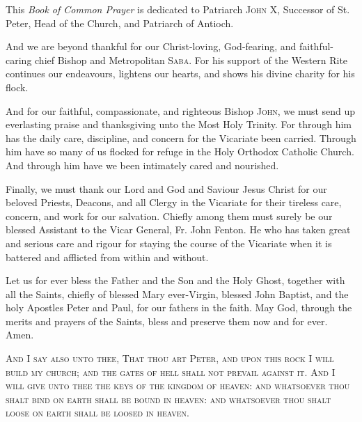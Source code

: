 {}
\noindent
This \textit{Book of Common Prayer} is dedicated to Patriarch \textsc{John X},  Successor of St. Peter, Head of the Church, and Patriarch of Antioch.\\
\par\noindent
And we are beyond thankful for our Christ-loving, God-fearing, and faithful-caring chief Bishop and Metropolitan \textsc{Saba}. For his support of the Western Rite continues our endeavours, lightens our hearts, and shows his divine charity for his flock.\\
\par\noindent
And for our faithful, compassionate, and righteous Bishop \textsc{John}, we must send up everlasting praise and thanksgiving unto the Most Holy Trinity. For through him has the daily care, discipline, and concern for the Vicariate been carried. Through him have so many of us flocked for refuge in the Holy Orthodox Catholic Church. And through him have we been intimately cared and nourished.\\
\par\noindent
Finally, we must thank our Lord and God and Saviour Jesus Christ for our beloved Priests, Deacons, and all Clergy in the Vicariate for their tireless care, concern, and work for our salvation. Chiefly among them must surely be our blessed Assistant to the Vicar General, Fr. John Fenton. He who has taken great and serious care and rigour for staying the course of the Vicariate when it is battered and afflicted from within and without.\\
\par\noindent
Let us for ever bless the Father and the Son and the Holy Ghost, together with all the Saints, chiefly of blessed Mary ever-Virgin, blessed John Baptist, and the holy Apostles Peter and Paul, for our fathers in the faith. May God, through the merits and prayers of the Saints, bless and preserve them now and for ever. Amen.
\vfill
\begin{center}
\textsc{And I say also unto thee, That thou art Peter, and upon this rock I will build my church; and the gates of hell shall not prevail against it. And I will give unto thee the keys of the kingdom of heaven: and whatsoever thou shalt bind on earth shall be bound in heaven: and whatsoever thou shalt loose on earth shall be loosed in heaven.}
\end{center}